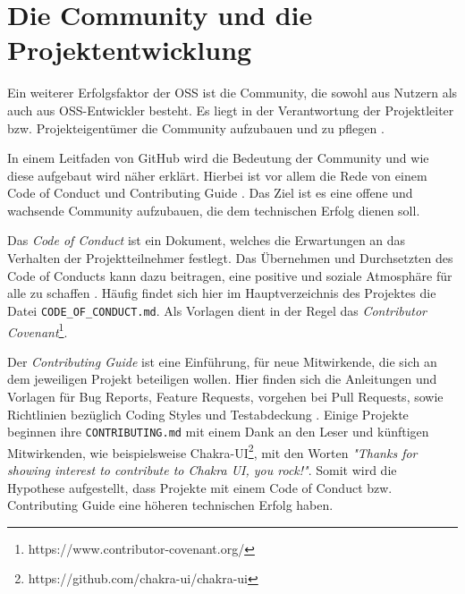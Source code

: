 \section{Die Community und die Projektentwicklung}\label{sec:community}



Ein weiterer Erfolgsfaktor der OSS ist die Community, die sowohl aus Nutzern als auch aus OSS-Entwickler
besteht. Es liegt in der Verantwortung der Projektleiter bzw. Projekteigentümer die Community aufzubauen
und zu pflegen \cite{bangerthWhatMakesComputational2013,GitHubBuildingWelcomingCommunities2022}.


In einem Leitfaden von GitHub wird die Bedeutung der Community und wie diese aufgebaut wird näher erklärt.
Hierbei ist vor allem die Rede von einem Code of Conduct und Contributing Guide
\cite{GitHubBuildingWelcomingCommunities2022}. Das Ziel ist es eine offene und wachsende Community
aufzubauen, die dem technischen Erfolg dienen soll.



Das \textit{Code of Conduct} ist ein Dokument, welches die Erwartungen an das Verhalten der Projektteilnehmer
festlegt. Das Übernehmen und Durchsetzten des Code of Conducts kann dazu beitragen, eine positive
und soziale Atmosphäre für alle zu schaffen \cite{GitHubYourCodeOfConduct2022}. %
Häufig findet sich hier im Hauptverzeichnis des Projektes die Datei \texttt{CODE\_OF\_CONDUCT.md}.
Als Vorlagen dient in der Regel das \textit{Contributor Covenant}\footnote{https://www.contributor-covenant.org/}.


Der \textit{Contributing Guide} ist eine Einführung, für neue Mitwirkende,
die sich an dem jeweiligen Projekt beteiligen wollen. Hier finden sich die Anleitungen und Vorlagen für
Bug Reports, Feature Requests, vorgehen bei Pull Requests, sowie Richtlinien bezüglich
Coding Styles und Testabdeckung \cite{GitHubStartingAProject2022}. %
Einige Projekte beginnen ihre \texttt{CONTRIBUTING.md} mit einem Dank an den Leser und künftigen
Mitwirkenden, wie beispielsweise Chakra-UI\footnote{https://github.com/chakra-ui/chakra-ui},
mit den Worten
\textit{"Thanks for showing interest to contribute to Chakra UI, you rock!"}.
Somit wird die Hypothese aufgestellt, dass Projekte mit einem Code of Conduct bzw. Contributing
Guide eine höheren technischen Erfolg haben.

